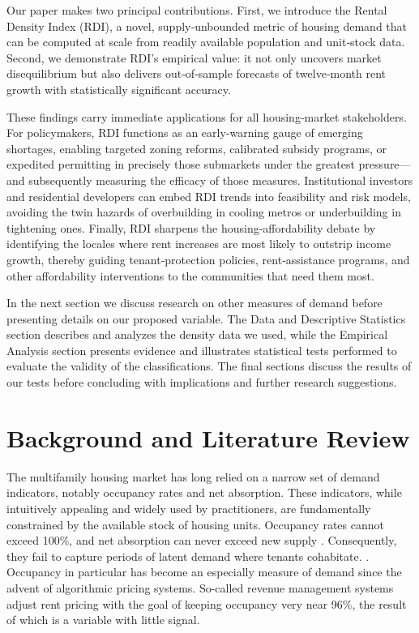 \documentclass[APA,Times1COL]{WileyNJDv5} %
\begin{document}
Our paper makes two principal contributions. First, we introduce the Rental Density Index (RDI), a novel, supply‑unbounded metric of housing demand that can be computed at scale from readily available population and unit‐stock data. Second, we demonstrate RDI’s empirical value: it not only uncovers market disequilibrium but also delivers out‑of‑sample forecasts of twelve‑month rent growth with statistically significant accuracy.

These findings carry immediate applications for all housing‐market stakeholders. For policymakers, RDI functions as an early‑warning gauge of emerging shortages, enabling targeted zoning reforms, calibrated subsidy programs, or expedited permitting in precisely those submarkets under the greatest pressure—and subsequently measuring the efficacy of those measures. Institutional investors and residential developers can embed RDI trends into feasibility and risk models, avoiding the twin hazards of overbuilding in cooling metros or underbuilding in tightening ones. Finally, RDI sharpens the housing‐affordability debate by identifying the locales where rent increases are most likely to outstrip income growth, thereby guiding tenant‐protection policies, rent‐assistance programs, and other affordability interventions to the communities that need them most.

In the next section we discuss research on other measures of demand before presenting details on our proposed variable. The Data and Descriptive Statistics section describes and analyzes the density data we used, while the Empirical Analysis section presents evidence and illustrates statistical tests performed to evaluate the validity of the classifications. The final sections discuss the results of our tests before concluding with implications and further research suggestions. 

\section{Background and Literature Review}\label{sec2}

The multifamily housing market has long relied on a narrow set of demand indicators, notably occupancy rates and net absorption. These indicators, while intuitively appealing and widely used by practitioners, are fundamentally constrained by the available stock of housing units. Occupancy rates cannot exceed 100\%, and net absorption can never exceed new supply \cite{mueller1999real, gabriel2001rental}. Consequently, they fail to capture periods of latent demand where tenants cohabitate. \cite{sirmans1991determinants, pyhrr1999real}. Occupancy in particular has become an especially measure of demand since the advent of algorithmic pricing systems. So-called revenue management systems adjust rent pricing with the goal of keeping occupancy very near 96\%, \cite{calder2024coordinated} the result of which is a variable with little signal. 
\end{document}
